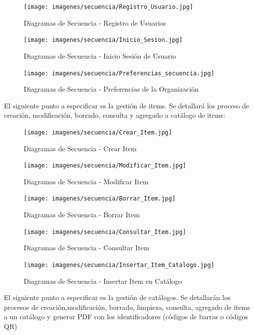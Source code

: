 \documentclass[a4paper,11pt]{book}
\begin{document}
\begin{figure}[H] 
\centering 
\texttt{[image: imagenes/secuencia/Registro\_Usuario.jpg]}
\caption{ Diagramas de Secuencia - Registro de Usuarios\cite{diagrama}  }  
\end{figure}

\begin{figure}[H] 
\centering 
\texttt{[image: imagenes/secuencia/Inicio\_Sesion.jpg]}
\caption{ Diagramas de Secuencia - Inicio Sesión de Usuario\cite{diagrama}  }  
\end{figure}

\begin{figure}[H] 
\centering 
\texttt{[image: imagenes/secuencia/Preferencias\_secuencia.jpg]}
\caption{ Diagramas de Secuencia - Preferencias de la Organización\cite{diagrama}  }  
\end{figure}


El siguiente punto a especificar es la gestión de items. Se detallará los proceso de creación, modificación, borrado, consulta y agregado a catálogo de items:

\begin{figure}[H] 
\centering 
\texttt{[image: imagenes/secuencia/Crear\_Item.jpg]}
\caption{ Diagramas de Secuencia - Crear Item\cite{diagrama}  }  
\end{figure}

\begin{figure}[H] 
\centering 
\texttt{[image: imagenes/secuencia/Modificar\_Item.jpg]}
\caption{ Diagramas de Secuencia - Modificar Item\cite{diagrama}  }  
\end{figure}

\begin{figure}[H] 
\centering 
\texttt{[image: imagenes/secuencia/Borrar\_Item.jpg]}
\caption{ Diagramas de Secuencia - Borrar Item\cite{diagrama}  }  
\end{figure}

\begin{figure}[H] 
\centering 
\texttt{[image: imagenes/secuencia/Consultar\_Item.jpg]}
\caption{ Diagramas de Secuencia - Consultar Item\cite{diagrama}  }  
\end{figure}

\begin{figure}[H] 
\centering 
\texttt{[image: imagenes/secuencia/Insertar\_Item\_Catalogo.jpg]}
\caption{ Diagramas de Secuencia - Insertar Item en Catálogo\cite{diagrama}  }  
\end{figure}

El siguiente punto a especificar es la gestión de catálogos. Se detallarán los procesos de creación,modificación, borrado, limpieza, consulta, agregado de items a un catálogo y generar PDF con los identificadores (códigos de barras o códigos QR)  
\end{document}
